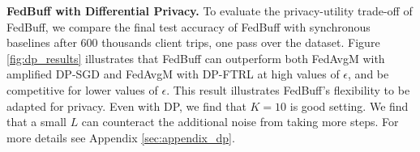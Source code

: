 \documentclass[twoside]{article}
\newcommand{\algname}{{FedBuff}\xspace}
\newcommand{\concurrency}{{concurrency}\xspace}
\newcommand{\syncfl}{{SyncFL}\xspace}
\begin{document}
\textbf{\algname with Differential Privacy.} To evaluate the privacy-utility trade-off of \algname, we compare the final test accuracy of \algname with synchronous baselines after 600 thousands client trips, one pass over the dataset. Figure \ref{fig:dp_results} illustrates that \algname can outperform both FedAvgM with amplified DP-SGD and FedAvgM with DP-FTRL at high values of $\epsilon$, and be competitive for lower values of $\epsilon$. This result illustrates \algname's flexibility to be adapted for privacy. Even with DP, we find that $K=10$ is good setting. We find that a small $L$ can counteract the additional noise from taking more steps. For more details see Appendix \ref{sec:appendix_dp}. 






\end{document}
